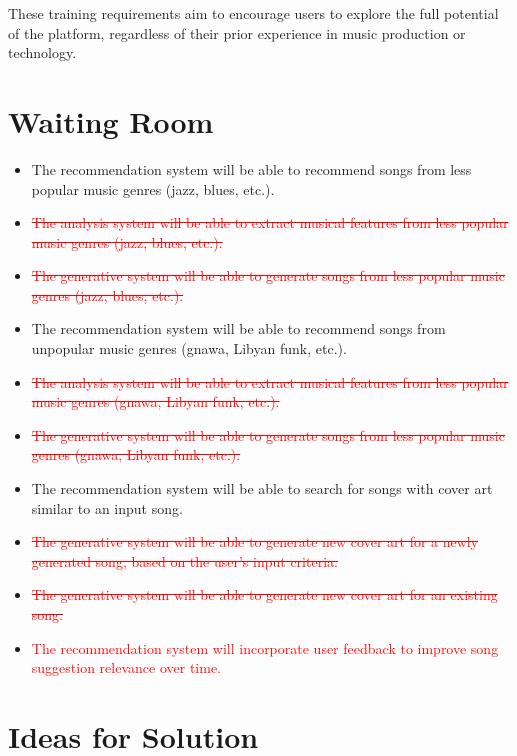 \documentclass[12pt]{article}
\begin{document}
These training requirements aim to encourage users to explore the full potential of the platform, regardless of their prior experience in music production or technology.

\section{Waiting Room}

\begin{itemize}
  \item The recommendation system will be able to recommend songs from less popular music genres (jazz, blues, etc.).
  \item \textcolor{red}{\sout{The analysis system will be able to extract musical features from less popular music genres (jazz, blues, etc.).}}
  \item \textcolor{red}{\sout{The generative system will be able to generate songs from less popular music genres (jazz, blues, etc.).}}
  \item The recommendation system will be able to recommend songs from unpopular music genres (gnawa, Libyan funk, etc.).
  \item \textcolor{red}{\sout{The analysis system will be able to extract musical features from less popular music genres (gnawa, Libyan funk, etc.).}}
  \item \textcolor{red}{\sout{The generative system will be able to generate songs from less popular music genres (gnawa, Libyan funk, etc.).}}
  \item The recommendation system will be able to search for songs with cover art similar to an input song.
  \item \textcolor{red}{\sout{The generative system will be able to generate new cover art for a newly generated song, based on the user's input criteria.}}
  \item \textcolor{red}{\sout{The generative system will be able to generate new cover art for an existing song.}}
  \item \textcolor{red}{The recommendation system will incorporate user feedback to improve song suggestion relevance over time.}
\end{itemize}

\section{Ideas for Solution}
\end{document}
